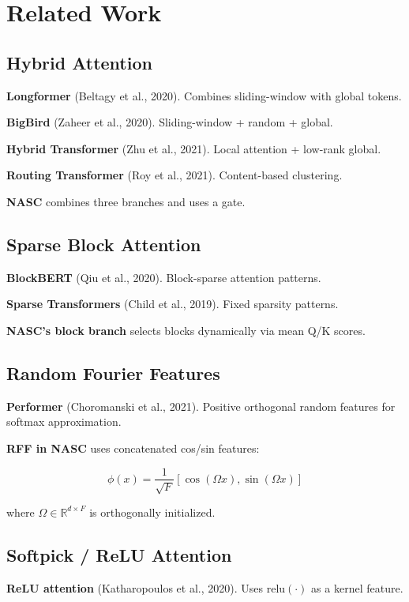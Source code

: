 
\section{Related Work}

\subsection{Hybrid Attention}

\textbf{Longformer} (Beltagy et al., 2020). Combines sliding-window with global 
tokens.

\textbf{BigBird} (Zaheer et al., 2020). Sliding-window + random + global.

\textbf{Hybrid Transformer} (Zhu et al., 2021). Local attention + low-rank 
global.

\textbf{Routing Transformer} (Roy et al., 2021). Content-based clustering.

\textbf{NASC} combines three branches and uses a gate.

\subsection{Sparse Block Attention}

\textbf{BlockBERT} (Qiu et al., 2020). Block-sparse attention patterns.

\textbf{Sparse Transformers} (Child et al., 2019). Fixed sparsity patterns.

\textbf{NASC's block branch} selects blocks dynamically via mean Q/K scores.

\subsection{Random Fourier Features}

\textbf{Performer} (Choromanski et al., 2021). Positive orthogonal random features 
for softmax approximation.

\textbf{RFF in NASC} uses concatenated cos/sin features:

\[
\phi(x) = \frac{1}{\sqrt{F}} [\cos(\Omega x), \sin(\Omega x)]
\tag{2.1}
\]

where $\Omega \in \mathbb{R}^{d \times F}$ is orthogonally initialized.

\subsection{Softpick / ReLU Attention}

\textbf{ReLU attention} (Katharopoulos et al., 2020). Uses $\text{relu}(\cdot)$ as 
a kernel feature.

